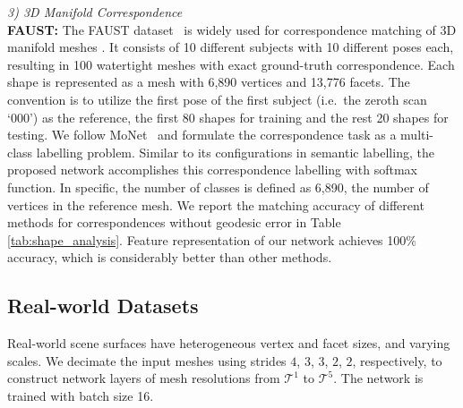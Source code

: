 \vspace{1mm}
\noindent\textit{3) 3D Manifold Correspondence}
\vspace{1mm}\\
\noindent\textbf{FAUST:} The FAUST
dataset~\cite{bogo2014faust} is widely used for correspondence matching of 3D manifold meshes \cite{masci2015geodesic,boscaini2016learning,monti2017geometric}.
It consists of 10 different subjects with 10 different poses each, resulting in 100 watertight meshes with exact ground-truth correspondence. Each
shape is represented as a mesh with 6,890 vertices and 13,776 facets. The convention is to utilize the first pose of the
first subject (i.e.~the zeroth scan `000') as the reference, the first 80 shapes for training and the rest 20 shapes for testing. We follow MoNet~\cite{monti2017geometric} and formulate the correspondence task as a multi-class labelling problem. Similar to its configurations in semantic labelling, the proposed network accomplishes this correspondence labelling with softmax function. In specific, the number of classes is defined as 6,890, \ie 
the number of vertices in the reference mesh. We report the matching accuracy of different methods for correspondences without geodesic error in Table \ref{tab:shape_analysis}. 
Feature representation of our network achieves 100\% accuracy, which is considerably better than other methods.  

\vspace{-2mm}
\subsection{Real-world Datasets}\label{sec:realistic_data}
Real-world scene surfaces have heterogeneous vertex and facet sizes, and  varying scales. We decimate the input meshes using strides $4$, $3$, $3$, $2$, $2$, respectively, 
to construct network layers of mesh resolutions from $\mathcal{T}^1$ to $\mathcal{T}^5$.
The network is trained with batch size 16.

